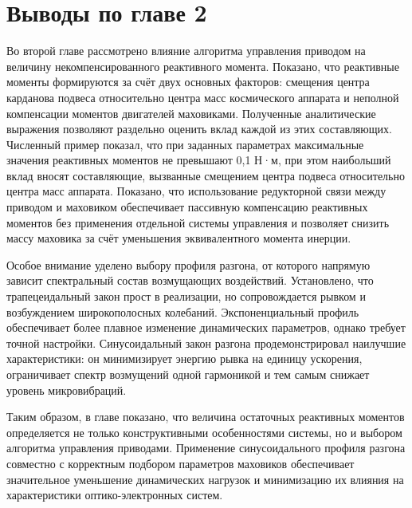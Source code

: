 \section*{Выводы по главе 2}
Во второй главе рассмотрено влияние алгоритма управления приводом на величину некомпенсированного реактивного момента. Показано, что реактивные моменты формируются за счёт двух основных факторов: смещения центра карданова подвеса относительно центра масс космического аппарата и неполной компенсации моментов двигателей маховиками. Полученные аналитические выражения позволяют раздельно оценить вклад каждой из этих составляющих. Численный пример показал, что при заданных параметрах максимальные значения реактивных моментов не превышают 0,1 Н·м, при этом наибольший вклад вносят составляющие, вызванные смещением центра подвеса относительно центра масс аппарата. Показано, что использование редукторной связи между приводом и маховиком обеспечивает пассивную компенсацию реактивных моментов без применения отдельной системы управления и позволяет снизить массу маховика за счёт уменьшения эквивалентного момента инерции.

Особое внимание уделено выбору профиля разгона, от которого напрямую зависит спектральный состав возмущающих воздействий. Установлено, что трапецеидальный закон прост в реализации, но сопровождается рывком и возбуждением широкополосных колебаний. Экспоненциальный профиль обеспечивает более плавное изменение динамических параметров, однако требует точной настройки. Синусоидальный закон разгона продемонстрировал наилучшие характеристики: он минимизирует энергию рывка на единицу ускорения, ограничивает спектр возмущений одной гармоникой и тем самым снижает уровень микровибраций.

Таким образом, в главе показано, что величина остаточных реактивных моментов определяется не только конструктивными особенностями системы, но и выбором алгоритма управления приводами. Применение синусоидального профиля разгона совместно с корректным подбором параметров маховиков обеспечивает значительное уменьшение динамических нагрузок и минимизацию их влияния на характеристики оптико-электронных систем.





\FloatBarrier
